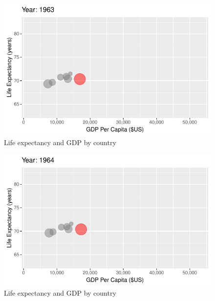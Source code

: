 \documentclass[
  letterpaper,
  DIV=11,
  numbers=noendperiod]{scrreport}
\theoremstyle{definition}
\theoremstyle{remark}
\begin{document}
\begin{figure}

{\centering \includegraphics{index_files/figure-pdf/fig-anim-country-21.pdf}

}

\caption{\label{fig-anim-country-21}Life expectancy and GDP by country}

\end{figure}

\begin{figure}

{\centering \includegraphics{index_files/figure-pdf/fig-anim-country-22.pdf}

}

\caption{\label{fig-anim-country-22}Life expectancy and GDP by country}

\end{figure}
\end{document}
